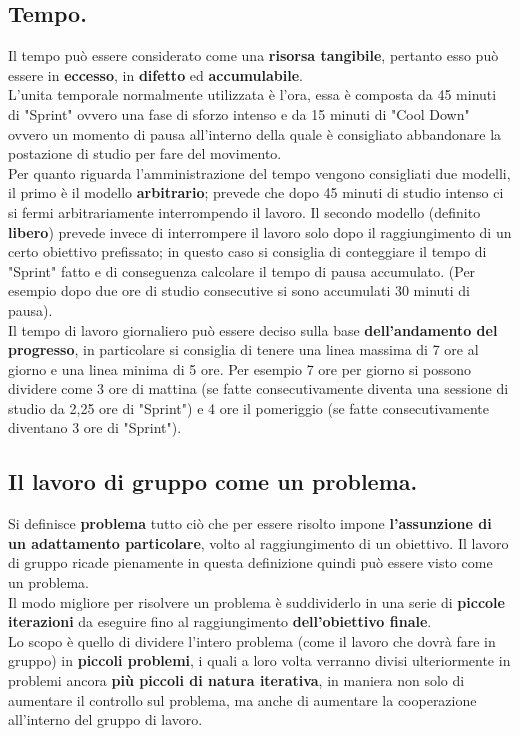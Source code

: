 \documentclass[11pt,a4paper]{article}
\begin{document}
	\subsection{Tempo.}
	 Il tempo può essere considerato come una \textbf{risorsa tangibile}, pertanto esso può essere in \textbf{eccesso}, in \textbf{difetto} ed \textbf{accumulabile}.\\
	L'unita temporale normalmente utilizzata è l'ora, essa è composta da 45 minuti di "Sprint" ovvero una fase di sforzo intenso e da 15 minuti di "Cool Down" ovvero un momento di pausa all'interno della quale è consigliato abbandonare la postazione di studio per fare del movimento. \\
	Per quanto riguarda l'amministrazione del tempo vengono consigliati due modelli, il primo è il  modello \textbf{arbitrario}; prevede che dopo 45 minuti di studio intenso ci si fermi arbitrariamente interrompendo il lavoro. Il secondo modello (definito \textbf{libero}) prevede invece di interrompere il lavoro solo dopo il raggiungimento di un certo obiettivo prefissato; in questo caso si consiglia di conteggiare il tempo di "Sprint" fatto e di conseguenza calcolare il tempo di pausa accumulato. (Per esempio dopo due ore di studio consecutive si sono accumulati 30 minuti di pausa).\\
	Il tempo di lavoro giornaliero può essere deciso sulla base \textbf{dell'andamento del progresso}, in particolare si consiglia di tenere una linea massima di 7 ore al giorno e una linea minima di 5 ore. Per esempio 7 ore per giorno si possono dividere come 3 ore di mattina (se fatte consecutivamente diventa una sessione di studio da 2,25 ore di "Sprint") e 4 ore il pomeriggio (se fatte consecutivamente diventano 3 ore di "Sprint").\\
	
	\subsection{Il lavoro di gruppo come un problema.} 
	Si definisce \textbf{problema} tutto ciò che per essere risolto impone \textbf{l'assunzione di un adattamento particolare}, volto al raggiungimento di un obiettivo. Il lavoro di gruppo ricade pienamente in questa definizione quindi può essere visto come un problema.\\
	Il modo migliore per risolvere un problema è suddividerlo in una serie di \textbf{piccole iterazioni} da eseguire fino al raggiungimento \textbf{dell'obiettivo finale}.\\
	Lo scopo è quello di dividere l'intero problema (come il lavoro che dovrà fare in gruppo) in  \textbf{piccoli problemi}, i quali a loro volta verranno divisi ulteriormente in problemi ancora \textbf{più piccoli di natura iterativa}, in maniera non solo di aumentare il controllo sul problema, ma anche di aumentare la cooperazione all'interno del gruppo di lavoro.\\ 
	
\end{document}
